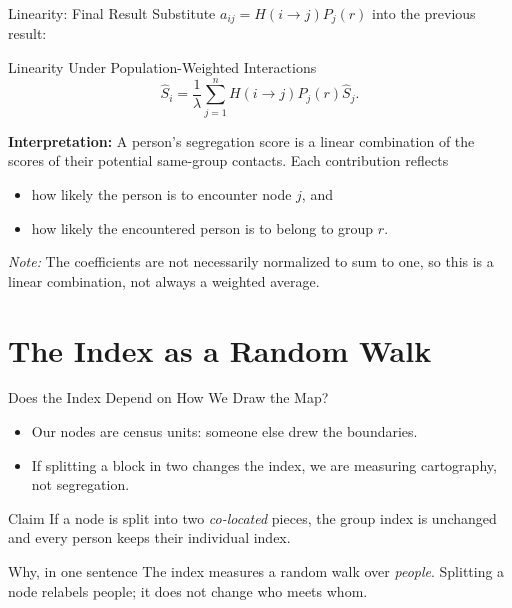 \documentclass[aspectratio=169,10pt]{beamer}
\begin{document}
\begin{frame}[shrink=0]{Linearity: Final Result}
\small
Substitute $a_{ij}=H(i\to j)P_j(r)$ into the previous result:
\begin{block}{Linearity Under Population-Weighted Interactions}
\[
\boxed{\hat S_i=\frac{1}{\lambda}\sum_{j=1}^{n}
H(i\to j)P_j(r)\hat S_j.}
\]
\end{block}
\medskip
\textbf{Interpretation:} A person's segregation score is a
linear combination of the scores of their potential same-group
contacts. Each contribution reflects
\begin{itemize}
\item how likely the person is to encounter node $j$, and
\item how likely the encountered person is to belong to group $r$.
\end{itemize}
\medskip
\footnotesize\emph{Note:} The coefficients are not necessarily
normalized to sum to one, so this is a linear combination,
not always a weighted average.
\end{frame}


\section{The Index as a Random Walk}
 
\begin{frame}[shrink=0]{Does the Index Depend on How We Draw the Map?}
\begin{itemize}
    \item Our nodes are census units: someone else drew the boundaries.
    \item If splitting a block in two changes the index, we are measuring
    \alert{cartography}, not segregation.
\end{itemize}
 
\vspace{0.3cm}
\begin{block}{Claim}
If a node is split into two \emph{co-located} pieces, the group index
is unchanged and every person keeps their individual index.
\end{block}
 
\vspace{0.2cm}
\begin{block}{Why, in one sentence}
The index measures a random walk over \emph{people}. Splitting a node
relabels people; it does not change who meets whom.
\end{block}
\end{frame}
 
\end{document}
